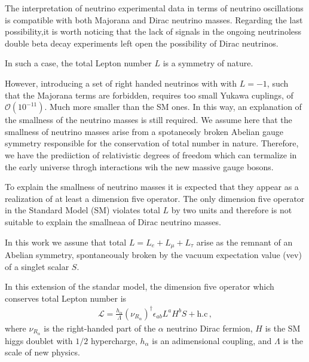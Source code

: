 





The interpretation of neutrino experimental data in terms of neutrino oscillations  is compatible with both Majorana and Dirac neutrino masses. Regarding the last possibility,it is worth noticing that the lack of signals in the ongoing neutrinoless double beta decay experiments left  open the possibility of Dirac neutrinos.



In such a case, the total Lepton number $L$ is a symmetry of nature.

However, introducing a set of right handed neutrinos with with $L=-1$,
such that the Majorana terms are forbidden, requires too small Yukawa cuplings, of $\mathcal{O}(10^{-11})$. Much more smaller than the SM ones. In this way, an explanation of the smallness of the neutrino masses is still required. We assume here that the smallness of neutrino masses arise from a spotaneosly broken Abelian gauge symmetry responsible for the conservation of total number in nature. Therefore, we have the prediiction of relativistic degrees of freedom which can termalize in the early universe throgh interactions wih the new massive gauge bosons.

To explain the smallness of neutrino masses it is expected that they appear as a realization of at least a  dimension five operator. The only dimension five operator in the Standard Model (SM) violates total $L$  by two units and therefore is not suitable to explain the smallneaa of Dirac neutrino masses.

In this work we assune that total $L=L_e+L_\mu+L_\tau$ arise as the remnant of an Abelian symmetry, spontaneoualy broken by the vacuum expectation value (vev) of a singlet scalar $S$. %

In this extension of the standar model, the dimension five operator which conserves total Lepton number is~\cite{}
\begin{align}
  \mathcal{L}=
  \frac{h_{\alpha}}{\Lambda} (\nu_{R_\alpha})^\dagger \epsilon_{ab}L^a H^b S + \text{h.c}\,,
\end{align}
where $\nu_{R_\alpha}$ is the right-handed part of  the $\alpha$ neutrino Dirac fermion, $H$ is the SM higgs doublet with $1/2$ hypercharge,
$h_{\alpha}$ is an adimensional coupling, and $\Lambda$ is the scale of new physics.

